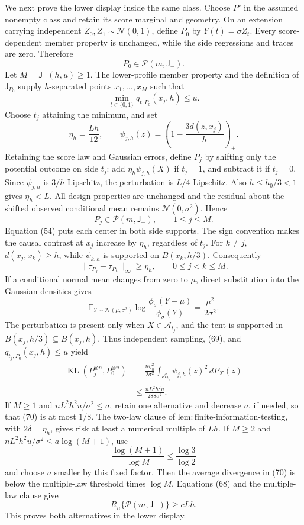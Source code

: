 We next prove the lower display inside the same class.  Choose
\(P^\circ\) in the assumed nonempty class and retain its score marginal
and geometry.  On an extension carrying independent
\(Z_0,Z_1\sim\mathcal N(0,1)\), define \(P_0\) by
\(Y(t)=\sigma Z_t\).  Every score-dependent member property is
unchanged, while the side regressions and traces are zero.  Therefore
\[
 P_0\in\mathcal P(m,\mathsf J_{-}). \tag{65}
\]
Let \(M=\mathsf J_{-}(h,u)\ge1\).  The lower-profile member property and
the definition of \(\mathsf J_{P_0}\) supply \(h\)-separated points
\(x_1,\ldots,x_M\) such that
\[
 \min_{t\in\{0,1\}}q_{t,P_0}(x_j,h)\le u.
\]
Choose \(t_j\) attaining the minimum, and set
\[
 \eta_h=\frac{Lh}{12},
 \qquad \psi_{j,h}(z)=\left(1-\frac{3d(z,x_j)}h\right)_+. \tag{66}
\]
Retaining the score law and Gaussian errors, define \(P_j\) by shifting
only the potential outcome on side \(t_j\): add
\(\eta_h\psi_{j,h}(X)\) if \(t_j=1\), and subtract it if \(t_j=0\).
Since \(\psi_{j,h}\) is \(3/h\)-Lipschitz, the perturbation is
\(L/4\)-Lipschitz.  Also \(h\le h_0/3<1\) gives \(\eta_h<L\).  All
design properties are unchanged and the residual about the shifted
observed conditional mean remains \(\mathcal N(0,\sigma^2)\).  Hence
\[
 P_j\in\mathcal P(m,\mathsf J_{-}),
 \qquad 1\le j\le M. \tag{67}
\]
Equation (54) puts each center in both side supports.  The sign convention
makes the causal contrast at \(x_j\) increase by \(\eta_h\), regardless
of \(t_j\).  For \(k\ne j\), \(d(x_j,x_k)\ge h\), while
\(\psi_{k,h}\) is supported on \(B(x_k,h/3)\).  Consequently
\[
 \|\tau_{P_j}-\tau_{P_k}\|_\infty\ge\eta_h,
 \qquad 0\le j<k\le M. \tag{68}
\]
If a conditional normal mean changes from zero to \(\mu\), direct
substitution into the Gaussian densities gives
\[
 \mathbb E_{Y\sim\mathcal N(\mu,\sigma^2)}
 \log\frac{\phi_\sigma(Y-\mu)}{\phi_\sigma(Y)}
 =\frac{\mu^2}{2\sigma^2}. \tag{69}
\]
The perturbation is present only when \(X\in\mathcal A_{t_j}\), and the
tent is supported in \(B(x_j,h/3)\subseteq B(x_j,h)\).  Thus independent
sampling, (69), and \(q_{t_j,P_0}(x_j,h)\le u\) yield
\[
 \begin{aligned}
 \operatorname{KL}(P_j^{\otimes n},P_0^{\otimes n})
 &=\frac{n\eta_h^2}{2\sigma^2}
 \int_{\mathcal A_{t_j}}\psi_{j,h}(z)^2\,dP_X(z)\\
 &\le\frac{nL^2h^2u}{288\sigma^2}.
 \end{aligned} \tag{70}
\]
If \(M\ge1\) and \(nL^2h^2u/\sigma^2\le a\), retain one alternative
and decrease \(a\), if needed, so that (70) is at most \(1/8\).  The
two-law clause of
\(\mathrm{lem:finite\text{-}information\text{-}testing}\), with
\(2\delta=\eta_h\), gives risk at least a numerical multiple of \(Lh\).
If \(M\ge2\) and
\(nL^2h^2u/\sigma^2\le a\log(M+1)\), use
\[
 \frac{\log(M+1)}{\log M}\le\frac{\log3}{\log2}
\]
and choose \(a\) smaller by this fixed factor.  Then the average
divergence in (70) is below the multiple-law threshold times \(\log M\).
Equations (68) and the multiple-law clause give
\[
 R_n\{\mathcal P(m,\mathsf J_{-})\}\ge cLh. \tag{71}
\]
This proves both alternatives in the lower display.

